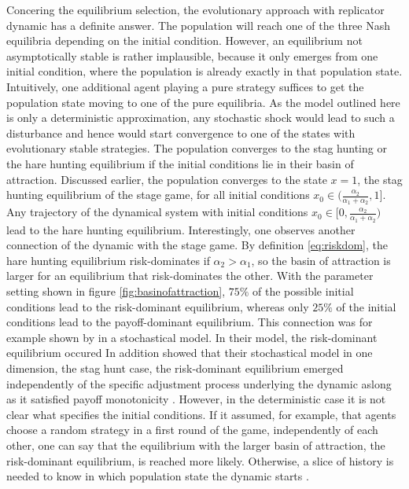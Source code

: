 Concering the equilibrium selection, the evolutionary approach with replicator
dynamic has a definite answer. The population will reach one of the three
Nash equilibria depending on the initial condition. 
However, an equilibrium not asymptotically stable is rather implausible,
because it only emerges from one initial condition, where the population
is already exactly in that population state. 
Intuitively, one additional agent playing
a pure strategy suffices to get the population state moving to one of the
pure equilibria. As the model outlined here is only a deterministic
approximation, any stochastic shock would lead to such a disturbance and hence
would start convergence to one of the states with evolutionary stable 
strategies.
The population converges to the stag hunting or the hare
hunting equilibrium if the initial conditions lie in their 
basin of attraction.
Discussed earlier, the population converges to the state $x=1$, 
the stag hunting equilibrium of the stage game, for all initial conditions 
$x_0 \in (\frac{\alpha_2}{\alpha_1+\alpha_2},1]$. Any trajectory of the 
dynamical system with initial conditions 
$x_0 \in [0,\frac{\alpha_2}{\alpha_1+\alpha_2})$ lead to the hare hunting
equilibrium. Interestingly, one observes another connection of the 
dynamic with the stage game. 
By definition \eqref{eq:riskdom}, 
the hare hunting equilibrium risk-dominates if $\alpha_2 > \alpha_1$,
so the basin of attraction is larger for an equilibrium that 
risk-dominates the other. With the parameter setting shown
in figure \ref{fig:basinofattraction}, $75\%$ of the possible initial 
conditions lead to the risk-dominant equilibrium, whereas only $25\%$ of 
the  initial conditions lead to the payoff-dominant equilibrium. This 
connection was for example shown by \textcite{kandori_learning_1993} 
in a stochastical model. In their model, the risk-dominant equilibrium 
occured 
In addition \textcite{kandori_learning_1993} showed that their stochastical
model in one dimension, the stag hunt case, the risk-dominant equilibrium 
emerged independently of the specific adjustment process underlying the
dynamic aslong as it satisfied payoff monotonicity
\parencite[51]{kandori_learning_1993}.
However, in the deterministic case 
it is not clear what specifies the initial conditions. 
If it assumed, for example, that agents choose a random strategy 
in a first round of the game, independently of each other, 
one can say that the equilibrium with the
larger basin of attraction, the risk-dominant equilibrium, is reached more 
likely. Otherwise, a slice of history is needed to know in which population
state the dynamic starts \parencite{friedman_economic_1998}. 
